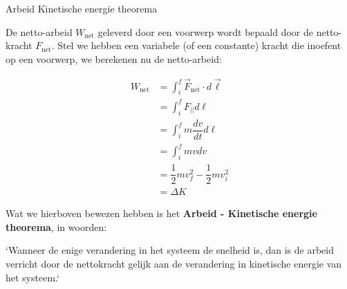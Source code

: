 \begin{lem}{Arbeid Kinetische energie theorema}

De netto-arbeid $ W_{\text{net}} $ geleverd door een voorwerp wordt bepaald door de netto-kracht $ F_{\text{net}} $. Stel we hebben een variabele (of een constante) kracht die inoefent op een voorwerp, we berekenen nu de netto-arbeid:

\vspace{-0.6cm}
\begin{align*}
    W_{\text{net}} &= \int_i^f \Vec{F}_{\text{net}} \cdot d\Vec{\ell} \\
            &= \int_i^f F_{||}d\ell \\
            &= \int_i^f m\dfrac{dv}{dt}d\ell \\
            &= \int_i^f mvdv  \\
            &= \dfrac{1}{2}mv_f^2 - \dfrac{1}{2}mv_i^2 \\
            &= \Delta K 
\end{align*}

\noindent Wat we hierboven bewezen hebben is het \textbf{Arbeid - Kinetische energie theorema}, in woorden: 

\vspace{0.3cm} \noindent  `Wanneer de enige verandering in het systeem de snelheid is, dan is de arbeid verricht door de nettokracht gelijk aan de verandering in kinetische energie van het systeem.`

\end{lem}

